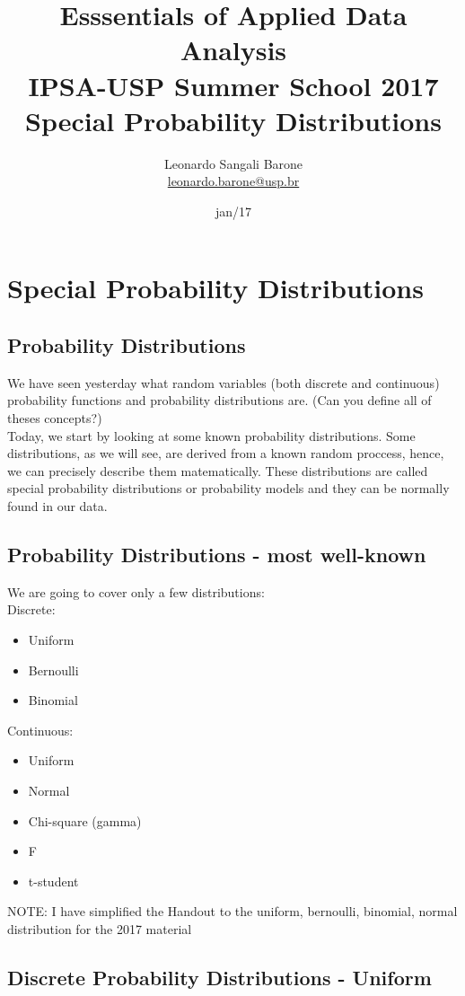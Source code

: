 \documentclass[11pt]{article}
\title{\textbf{Esssentials of Applied Data Analysis\\
				IPSA-USP Summer School 2017}\newline\\
				Special Probability Distributions}
\author{Leonardo Sangali Barone\\ \href{leonardo.barone@usp.br}{leonardo.barone@usp.br}}
\date{jan/17}
\begin{document}
\maketitle

\section*{Special Probability Distributions}

	\subsection*{Probability Distributions}
	We have seen yesterday what random variables (both discrete and continuous) probability functions and probability distributions are. (Can you define all of theses concepts?)\\
	
	Today, we start by looking at some known probability distributions. Some distributions, as we will see, are derived from a known random proccess, hence, we can precisely describe them matematically. These distributions are called special probability distributions or probability models and they can be normally found in our data.


	\subsection*{Probability Distributions - most well-known}
	We are going to cover only a few distributions:\\

	Discrete: 
	\begin{itemize}
		\item Uniform
		\item Bernoulli
		\item Binomial
	\end{itemize}
	
	Continuous:
	\begin{itemize}
		\item Uniform
		\item Normal
		\item Chi-square (gamma)
		\item F
		\item t-student
	\end{itemize}

	NOTE: I have simplified the Handout to the uniform, bernoulli, binomial, normal distribution for the 2017 material
		
	\subsection*{Discrete Probability Distributions - Uniform}
\end{document}
